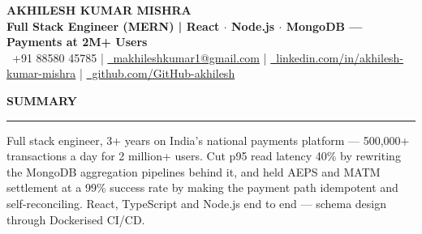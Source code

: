 \documentclass[10pt]{article}
\newcommand{\resumesection}[1]{%
  \vspace{6pt}%
  {\fontfamily{phv}\selectfont\textbf{\large\MakeUppercase{#1}}}%
  \vspace{2pt}%
  \hrule%
  \vspace{4pt}%
}
\begin{document}
\begin{center}
    {\selectfont\textbf{\Huge AKHILESH KUMAR MISHRA}} \\
    \vspace{3pt}
    {\selectfont\large\textbf{\textcolor{primaryblue}{Full Stack Engineer (MERN) | React $\cdot$ Node.js $\cdot$ MongoDB --- Payments at 2M+ Users}}} \\
    \vspace{4pt}
    {\small
    \textcolor{primaryblue}{\faPhone*}~+91 88580 45785 \quad | \quad
    \href{mailto:makhileshkumar1@gmail.com}{\textcolor{primaryblue}{\faEnvelope}~makhileshkumar1@gmail.com} \quad | \quad
    \href{https://linkedin.com/in/akhilesh-kumar-mishra-a46030231}{\textcolor{primaryblue}{\faLinkedin}~linkedin.com/in/akhilesh-kumar-mishra} \quad | \quad
    \href{https://github.com/GitHub-akhilesh}{\textcolor{primaryblue}{\faGithub}~github.com/GitHub-akhilesh}
    }
\end{center}
\vspace{-10pt}

\resumesection{Summary}
Full stack engineer, 3+ years on India's national payments platform --- 500,000+ transactions a day for 2 million+ users. Cut p95 read latency 40\% by rewriting the MongoDB aggregation pipelines behind it, and held AEPS and MATM settlement at a 99\% success rate by making the payment path idempotent and self-reconciling. React, TypeScript and Node.js end to end --- schema design through Dockerised CI/CD.
\end{document}
